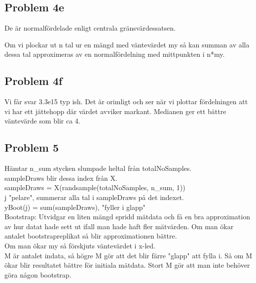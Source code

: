 \documentclass{article}
\begin{document}
\subsection*{Problem 4e}
De är normalfördelade enligt centrala gränsvärdessatsen. 

Om vi plockar ut n tal ur en mängd med väntevärdet my så kan summan av alla
dessa tal approximeras av en normalfördelning med mittpunkten i n*my.  
\subsection*{Problem 4f}
Vi får svar 3.3e15 typ ish. Det är orimligt och ser när vi plottar fördelningen
att vi har ett jättehopp där värdet avviker markant. Medianen ger ett bättre
väntevärde som blir ca 4.
\subsection*{Problem 5}
Hämtar n\_sum stycken slumpade heltal från totalNoSamples. \\sampleDraws blir
dessa index från X. \\ sampleDraws = X(randsample(totalNoSamples, n\_sum, 1)) \\j
"pelare", summerar alla tal i sampleDraws på det indexet. \\ yBoot(j) =
sum(sampleDraws), "fyller i glapp"
\\
Bootstrap: Utvidgar en liten mängd spridd mätdata och få en bra approximation av
hur datat hade sett ut ifall man hade haft fler mätvärden. Om man ökar antalet
bootstrapreplikat så blir approximationen bättre.
\\Om man ökar my så förskjuts väntevärdet i x-led.
\\M är antalet indata, så högre M gör att det blir färre "glapp" att fylla i. Så
om M ökar blir resultatet bättre för initiala mätdata. Stort M gör att man inte
behöver göra någon bootstrap.
\end{document}
